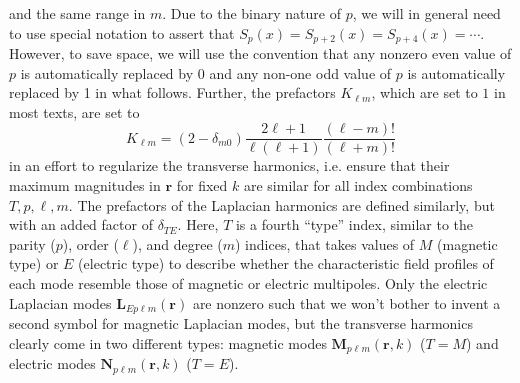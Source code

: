 \documentclass{article}
\begin{document}
and the same range in $m$. Due to the binary nature of $p$, we will in general need to use special notation to assert that $S_p(x) = S_{p + 2}(x) = S_{p+4}(x) = \cdots$. However, to save space, we will use the convention that any nonzero even value of $p$ is automatically replaced by 0 and any non-one odd value of $p$ is automatically replaced by 1 in what follows. Further, the prefactors $K_{\ell m}$, which are set to $1$ in most texts, are set to
\begin{equation}
K_{\ell m} = (2 - \delta_{m0})\frac{2\ell + 1}{\ell(\ell + 1)}\frac{(\ell - m)!}{(\ell + m)!}
\end{equation}
in an effort to regularize the transverse harmonics, i.e. ensure that their maximum magnitudes in $\mathbf{r}$ for fixed $k$ are similar for all index combinations $T,p,\ell,m$. The prefactors of the Laplacian harmonics are defined similarly, but with an added factor of $\delta_{TE}$. Here, $T$ is a fourth ``type'' index, similar to the parity ($p$), order ($\ell$), and degree ($m$) indices, that takes values of $M$ (magnetic type) or $E$ (electric type) to describe whether the characteristic field profiles of each mode resemble those of magnetic or electric multipoles. Only the electric Laplacian modes $\mathbf{L}_{Ep\ell m}(\mathbf{r})$ are nonzero such that we won't bother to invent a second symbol for magnetic Laplacian modes, but the transverse harmonics clearly come in two different types: magnetic modes $\mathbf{M}_{p\ell m}(\mathbf{r},k)$ ($T = M$) and electric modes $\mathbf{N}_{p\ell m}(\mathbf{r},k)$ ($T = E$).
\end{document}
